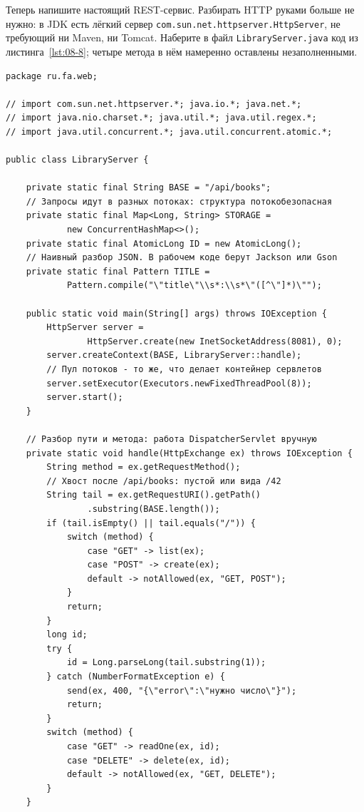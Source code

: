 Теперь напишите настоящий REST-сервис. Разбирать HTTP руками больше не нужно: в
JDK есть лёгкий сервер \texttt{com.sun.net.httpserver.HttpServer}, не требующий
ни Maven, ни Tomcat. Наберите в файл \texttt{LibraryServer.java} код из
листинга~\ref{lst:08-8}; четыре метода в нём намеренно оставлены
незаполненными.

\begin{listing}[H]
\begin{verbatim}
package ru.fa.web;

// import com.sun.net.httpserver.*; java.io.*; java.net.*;
// import java.nio.charset.*; java.util.*; java.util.regex.*;
// import java.util.concurrent.*; java.util.concurrent.atomic.*;

public class LibraryServer {

    private static final String BASE = "/api/books";
    // Запросы идут в разных потоках: структура потокобезопасная
    private static final Map<Long, String> STORAGE =
            new ConcurrentHashMap<>();
    private static final AtomicLong ID = new AtomicLong();
    // Наивный разбор JSON. В рабочем коде берут Jackson или Gson
    private static final Pattern TITLE =
            Pattern.compile("\"title\"\\s*:\\s*\"([^\"]*)\"");

    public static void main(String[] args) throws IOException {
        HttpServer server =
                HttpServer.create(new InetSocketAddress(8081), 0);
        server.createContext(BASE, LibraryServer::handle);
        // Пул потоков - то же, что делает контейнер сервлетов
        server.setExecutor(Executors.newFixedThreadPool(8));
        server.start();
    }

    // Разбор пути и метода: работа DispatcherServlet вручную
    private static void handle(HttpExchange ex) throws IOException {
        String method = ex.getRequestMethod();
        // Хвост после /api/books: пустой или вида /42
        String tail = ex.getRequestURI().getPath()
                .substring(BASE.length());
        if (tail.isEmpty() || tail.equals("/")) {
            switch (method) {
                case "GET" -> list(ex);
                case "POST" -> create(ex);
                default -> notAllowed(ex, "GET, POST");
            }
            return;
        }
        long id;
        try {
            id = Long.parseLong(tail.substring(1));
        } catch (NumberFormatException e) {
            send(ex, 400, "{\"error\":\"нужно число\"}");
            return;
        }
        switch (method) {
            case "GET" -> readOne(ex, id);
            case "DELETE" -> delete(ex, id);
            default -> notAllowed(ex, "GET, DELETE");
        }
    }


\end{verbatim}
\end{listing}
